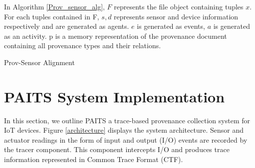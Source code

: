 \documentclass[conference]{IEEEtran}
\begin{document}
In Algorithm \ref{Prov_sensor_alg}, $F$  represents the  file object containing tuples $x$. For each tuples contained in F, $s, d$ represents sensor and device information respectively and are generated as agents. $e$ is generated as events, $a$ is generated as an activity. p is a memory representation of the provenance document containing all  provenance types and their relations.

\begin{algorithm}[h!]
\caption{Prov-Sensor Alignment}
\label{Prov_sensor_alg}

\end{algorithm}




\section{PAITS System Implementation}
In this section, we outline  PAITS a trace-based provenance collection system for IoT devices. Figure \ref{architecture} displays the system architecture. Sensor and actuator readings in the form of input and output (I/O) events are recorded by the tracer component. This component intercepts I/O and produces trace information represented in Common Trace Format (CTF). 
\end{document}
